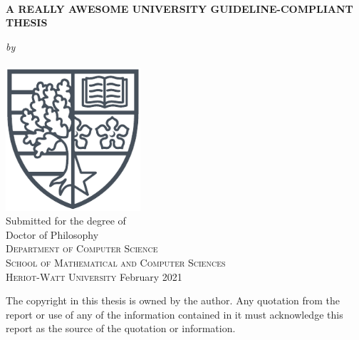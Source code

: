 \documentclass[a4paper,12pt]{report}
\date{\today}
\newcommand{\auth}{Your Name}
\newcommand{\thesistitle}{A Really Awesome University Guideline-Compliant Thesis}
\newcommand{\degree}{Doctor of Philosophy}
\newcommand{\supdate}{February 2021}
\begin{document}
\doublespacing

\pagestyle{empty}
\begin{center}
\begin{spacing}{2}
{\large{\ \\  \vspace{1.5cm}\textbf{\MakeUppercase{\thesistitle}}}}\\
\end{spacing}
\vfill
{\Large\textit{by}}\\\vspace{0.2cm}
{\Large\upshape{\auth}}\\\vspace{1.0cm}
\includegraphics[width=5cm]{HW_shield}\\
\vspace{1cm}
{\large Submitted for the degree of \\ \degree}\\
\vspace{1cm}
{\large\textsc{Department of Computer Science}\\
\textsc{School of Mathematical and Computer Sciences}\\
\textsc{Heriot-Watt University}}\vfill
{\large{\supdate}}
\end{center}
{\small The copyright in this thesis is owned by the author. Any quotation from the report or use of any of the information contained in it must acknowledge this report as the source of the quotation or information.}
\clearpage


\clearpage
\pagestyle{plain}
\clearpage{}

\tableofcontents
\listoftables
\listoffigures
\printacronyms %
\clearpage
\pagestyle{fancy}
\fancyhead{}
\lhead{\slshape \leftmark} 
\cfoot{\thepage}
\renewcommand{\headrulewidth}{0.4pt}
\renewcommand{\footrulewidth}{0.0pt}
\renewcommand{\chaptermark}[1]{\markboth{\chaptername\ \thechapter:\ #1}{}}
\end{document}
